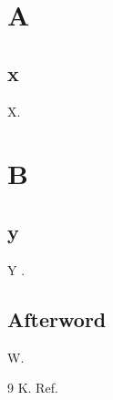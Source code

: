 \documentclass{book}
\begin{document}
\tableofcontents
\part{A}
\chapter{x}
X.
\part{B}
\chapter{y}
Y \cite{k}.
\backmatter
\chapter{Afterword}
W.
\begin{thebibliography}{9}
 K. Ref.
\end{thebibliography}
\printindex
\end{document}
